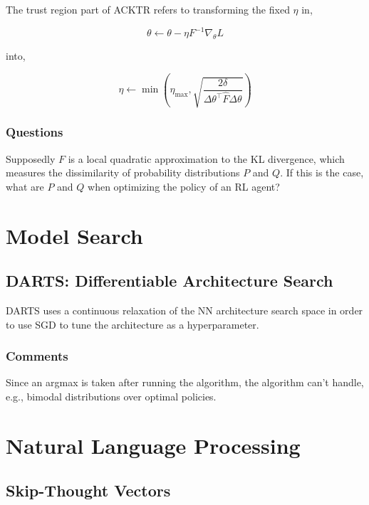 \documentclass[a4paper, 12pt]{article}
\begin{document}
The trust region part of ACKTR refers to transforming the fixed $\eta$ in,

\begin{equation*}
        \theta \leftarrow \theta - \eta F^{-1} \nabla_\theta L
\end{equation*}

into,

\begin{equation*}
        \eta \leftarrow \min\left(
                \eta_{\max}, \sqrt{
                        \frac{2\delta}{\Delta\theta^{\top}
                                       \hat{F}
                                       \Delta\theta}}\right)
\end{equation*}

\subsubsection{Questions}

Supposedly $F$ is a local quadratic approximation to the KL divergence, which
measures the dissimilarity of probability distributions $P$ and $Q$. If this is
the case, what are $P$ and $Q$ when optimizing the policy of an RL agent?


\section{Model Search}

\subsection{DARTS: Differentiable Architecture Search~\cite{liu2018darts}}

DARTS uses a continuous relaxation of the NN architecture search space in order
to use SGD to tune the architecture as a hyperparameter.


\subsubsection{Comments}

Since an argmax is taken after running the algorithm, the algorithm can't
handle, e.g., bimodal distributions over optimal policies.


\section{Natural Language Processing}


\subsection{Skip-Thought Vectors~\citet{DBLP:journals/corr/KirosZSZTUF15}}
\end{document}
